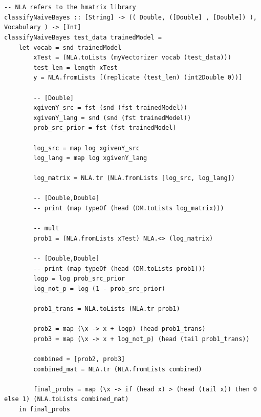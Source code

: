 \documentclass[12pt]{scrreprt}
\begin{document}
\begin{verbatim}
   
       
-- NLA refers to the hmatrix library
classifyNaiveBayes :: [String] -> (( Double, ([Double] , [Double]) ), Vocabulary ) -> [Int]
classifyNaiveBayes test_data trainedModel =
    let vocab = snd trainedModel
        xTest = (NLA.toLists (myVectorizer vocab (test_data)))
        test_len = length xTest
        y = NLA.fromLists [(replicate (test_len) (int2Double 0))]

        -- [Double]
        xgivenY_src = fst (snd (fst trainedModel))
        xgivenY_lang = snd (snd (fst trainedModel))
        prob_src_prior = fst (fst trainedModel)

        log_src = map log xgivenY_src
        log_lang = map log xgivenY_lang

        log_matrix = NLA.tr (NLA.fromLists [log_src, log_lang])

        -- [Double,Double]
        -- print (map typeOf (head (DM.toLists log_matrix)))

        -- mult
        prob1 = (NLA.fromLists xTest) NLA.<> (log_matrix)

        -- [Double,Double]
        -- print (map typeOf (head (DM.toLists prob1)))
        logp = log prob_src_prior
        log_not_p = log (1 - prob_src_prior)

        prob1_trans = NLA.toLists (NLA.tr prob1)

        prob2 = map (\x -> x + logp) (head prob1_trans)
        prob3 = map (\x -> x + log_not_p) (head (tail prob1_trans))

        combined = [prob2, prob3]
        combined_mat = NLA.tr (NLA.fromLists combined)
        
        final_probs = map (\x -> if (head x) > (head (tail x)) then 0 else 1) (NLA.toLists combined_mat)
    in final_probs       
\end{verbatim}
\end{document}

